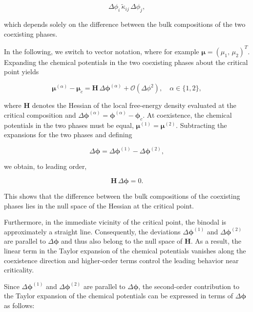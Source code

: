 \documentclass[12pt]{article}
\begin{document}
\[
    \Delta \phi_i \,\tilde\kappa_{ij}\, \Delta \phi_j,
\]

which depends solely on the difference between the bulk compositions of the two
coexisting phases.


In the following, we switch to vector notation, where for example \(\boldsymbol{\mu} = (\mu_1,\, \mu_2)^T\).
Expanding the chemical potentials in the two coexisting phases about the critical
point yields

\begin{equation}
    \boldsymbol{\mu}^{(\alpha)} - \boldsymbol{\mu}_c
    =
    \boldsymbol{H}\,\Delta\boldsymbol{\phi}^{(\alpha)} + \mathcal{O}(\Delta \phi^2),\quad \alpha \in \{1,2\},
\end{equation}

where $\boldsymbol{H}$ denotes the Hessian of the local free-energy density evaluated
at the critical composition and
$\Delta\boldsymbol{\phi}^{(\alpha)} = \boldsymbol{\phi}^{(\alpha)} - \boldsymbol{\phi}_c$.
At coexistence, the chemical potentials in the two phases must be equal,
$\boldsymbol{\mu}^{(1)}=\boldsymbol{\mu}^{(2)}$. Subtracting the expansions for the two phases and
defining

\[
    \Delta \boldsymbol{\phi}
    =
    \Delta \boldsymbol{\phi}^{(1)} - \Delta \boldsymbol{\phi}^{(2)},
\]

we obtain, to leading order,

\begin{equation}
    \boldsymbol{H}\,\Delta \boldsymbol{\phi} = 0.
    \label{eq:hessian_null_space}
\end{equation}

This shows that the difference between the bulk compositions of the coexisting
phases lies in the null space of the Hessian at the critical point.

Furthermore, in the immediate vicinity of the critical point, the binodal is
approximately a straight line. Consequently, the deviations
$\Delta \boldsymbol{\phi}^{(1)}$ and $\Delta \boldsymbol{\phi}^{(2)}$ are parallel to $\Delta \boldsymbol{\phi}$ and
thus also belong to the null space of $\boldsymbol{H}$. As a result, the linear term
in the Taylor expansion of the chemical potentials vanishes along the coexistence
direction and higher-order terms control the leading behavior near criticality.


Since \(\Delta \boldsymbol{\phi}^{(1)}\) and \(\Delta \boldsymbol{\phi}^{(2)}\) are parallel to \(\Delta \boldsymbol{\phi}\), the second-order contribution to the Taylor expansion of the chemical potentials can be expressed in terms of \(\Delta \boldsymbol{\phi}\) as follows:
\end{document}
